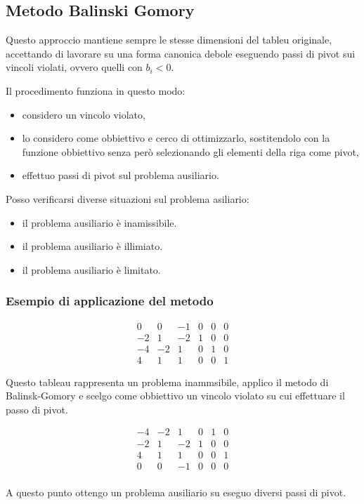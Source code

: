 \subsection{Metodo Balinski Gomory}
Questo approccio mantiene sempre le stesse dimensioni del tableu originale, accettando di lavorare su una forma canonica debole eseguendo passi di pivot sui vincoli violati, ovvero quelli con $b_i < 0$.

Il procedimento funziona in questo modo:
\begin{itemize}
	\item considero un vincolo violato,
	\item lo considero come obbiettivo e cerco di ottimizzarlo, sostitendolo con la funzione obbiettivo senza però selezionando gli elementi della riga come pivot,
	\item effettuo passi di pivot sul problema ausiliario.
\end{itemize}

Posso verificarsi diverse situazioni sul problema asiliario:

\begin{itemize}
	\item il problema ausiliario è inamissibile. 
	\item il problema ausiliario è illimiato.
	\item il problema ausiliario è limitato.
\end{itemize}

\subsubsection{Esempio di applicazione del metodo}
\[  
	\begin{array}{r|rrrrr}
		 0 &  0 & -1 & 0 & 0 & 0 \\
		\hline
		-2 &  1 & -2 & 1 & 0 & 0 \\
		-4 & -2 &  1 & 0 & 1 & 0 \\
		 4 &  1 &  1 & 0 & 0 & 1 
	\end{array}
\]

Questo tableau rappresenta un problema inammsibile, applico il metodo di Balinsk-Gomory e scelgo come obbiettivo un vincolo violato su cui effettuare il passo di pivot.

\[  
	\begin{array}{r|rrrrr}
		-4 & -2 &  1 & 0 & 1 & 0 \\
		\hline
		-2 &  1 & -2 & 1 & 0 & 0 \\
		 4 &  1 &  1 & 0 & 0 & 1 \\
		\hline
		 0 &  0 & -1 & 0 & 0 & 0 \\
	\end{array}
\]

A questo punto ottengo un problema ausiliario su eseguo diversi passi di pivot. 
